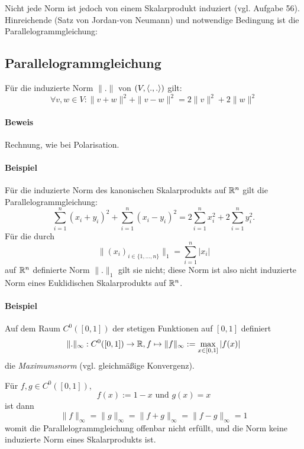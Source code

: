 	Nicht jede Norm ist jedoch von einem Skalarprodukt induziert (vgl. Aufgabe 56).
	Hinreichende (Satz von Jordan-von Neumann) und notwendige Bedingung ist die Parallelogrammgleichung:
	
\subsection{Parallelogrammgleichung}
\begin{Satz}[Parallelogrammgleichung]
	Für die induzierte Norm $ \|.\| $ von $ (V,\langle .,. \rangle) $ gilt:
		\[ \forall v,w\in V: \|v+w\|^2+\|v-w\|^2=2\|v\|^2+2\|w\|^2 \]
\end{Satz}		

 	\begin{figure}[H]\centering
 		
	\end{figure}
		
\paragraph{Beweis}
	Rechnung, wie bei Polarisation.
\paragraph{Beispiel}
	Für die induzierte Norm des kanonischen Skalarprodukts auf $ \mathbb{R}^n $ gilt die Parallelogrammgleichung:
		\[ \sum_{i=1}^{n}(x_i+y_i)^2 + \sum_{i=1}^{n}(x_i-y_i)^2 = 2\sum_{i=1}^{n}x_i^2+2\sum_{i=1}^{n}y_i^2. \]
	Für die durch
		\[ \|(x_i)_{i\in \{1,\dots,n\}}\|_1 = \sum_{i=1}^{n}|x_i| \]
	auf $ \mathbb{R}^n $ definierte Norm $ \|.\|_1 $ gilt sie nicht; diese Norm ist also nicht induzierte Norm eines Euklidischen Skalarprodukts auf $ \mathbb{R}^n $.
\paragraph{Beispiel}
	Auf dem Raum $ C^0([0,1]) $ der stetigen Funktionen auf $ [0,1] $ definiert
		\[ \|.\|_\infty: C^0([0,1]) \to \mathbb{R}, f\mapsto \|f\|_\infty := \max_{x\in [0,1]}|f(x)| \]
	die \emph{Maximumsnorm} (vgl. gleichmäßige Konvergenz).
	
	Für $ f,g\in C^0([0,1]) $,
		\[ f(x):= 1-x \text{ und } g(x) = x \]
	ist dann
		\[ \|f\|_\infty = \|g\|_\infty = \|f+g\|_\infty = \|f-g\|_\infty = 1 \]
	womit die Parallelogrammgleichung offenbar nicht erfüllt, und die Norm keine induzierte Norm eines Skalarprodukts ist.